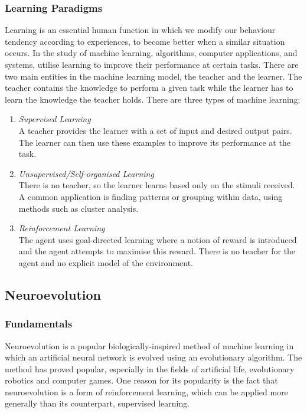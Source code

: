 \documentclass[11pt,a4paper]{article}
\begin{document}
\subsubsection{Learning Paradigms}
Learning is an essential human function in which we modify our behaviour tendency according to experiences, to become better when a similar situation occurs. In the study of machine learning, algorithms, computer applications, and systems, utilise learning to improve their performance at certain tasks. There are two main entities in the machine learning model, the teacher and the learner. The teacher contains the knowledge to perform a given task while the learner has to learn the knowledge the teacher holds. \cite{swarmann} There are three types of machine learning:
\begin{enumerate}
\item \emph{Supervised Learning}\\
A teacher provides the learner with a set of input and desired output pairs. The learner can then use these examples to improve its performance at the task.
\item \emph{Unsupervised/Self-organised Learning}\\
There is no teacher, so the learner learns based only on the stimuli received. A common application is finding patterns or grouping within data, using methods such as cluster analysis.
\item \emph{Reinforcement Learning}\\
The agent uses goal-directed learning where a notion of reward is introduced and the agent attempts to maximise this reward. There is no teacher for the agent and no explicit model of the environment.
\end{enumerate}
\newpage
\subsection{Neuroevolution}
\subsubsection{Fundamentals}
Neuroevolution is a popular biologically-inspired method of machine learning in which an artificial neural network is evolved using an evolutionary algorithm. The method has proved popular, especially in the fields of artificial life, evolutionary robotics and computer games. One reason for its popularity is the fact that neuroevolution is a form of reinforcement learning, which can be applied more generally than its counterpart, supervised learning. 
\end{document}
